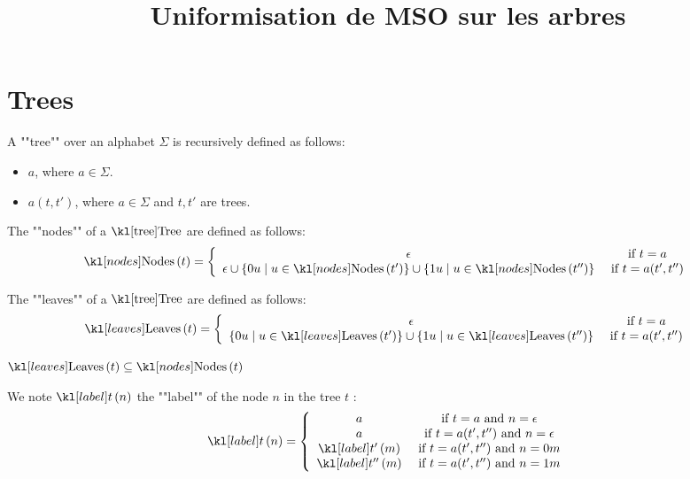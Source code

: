 \documentclass{article}
\begin{document}
\title{Uniformisation de MSO sur les arbres}

\maketitle

\section{Trees}


\begin{definition}[Tree]
	A ""tree"" over an alphabet $\Sigma$ is recursively defined as follows:
	\begin{itemize}
		\item $a$, where $a \in \Sigma$.
		\item $a(t,t')$, where $a \in \Sigma$ and $t, t'$ are trees.
	\end{itemize}
\end{definition}

\begin{definition}[Nodes]
	The ""nodes"" of a $\tree$ are defined as follows:
	$$
		\nodes t = \left\{  \begin{array}{cc}
			\epsilon                                & \text{ if } t = a         \\
			\epsilon \cup \setdef {0u} {u \in \nodes {t'}}
			\cup \setdef {1u} {u \in \nodes {t''} } & \text{ if } t = a(t',t'')
		\end{array}
		\right.
	$$
\end{definition}


\begin{definition}[Leaves]
	The ""leaves"" of a $\tree$ are defined as follows:
	$$
		\leaves t = \left\{  \begin{array}{cc}
			\epsilon                                 & \text{ if } t = a         \\
			\setdef {0u} {u \in \leaves {t'}}
			\cup \setdef {1u} {u \in \leaves {t''} } & \text{ if } t = a(t',t'')
		\end{array}
		\right.
	$$
\end{definition}

\begin{remark}
	$\leaves t \subseteq \nodes t$
\end{remark}

\begin{notation}
	We note $\tlabel t n$ the ""label"" of the node $n$ in the tree $t$ :
	$$
		\tlabel t n = \left\{  \begin{array}{cc}
			a               & \text{ if } t = a \text{ and } n = \epsilon         \\
			a               & \text{ if } t = a(t',t'') \text{ and } n = \epsilon \\
			\tlabel {t'} m  & \text{ if } t = a(t',t'') \text{ and } n = 0m       \\
			\tlabel {t''} m & \text{ if } t = a(t',t'') \text{ and } n = 1m
		\end{array}
		\right.
	$$
\end{notation}
\end{document}

